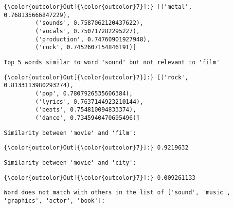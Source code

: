 \documentclass[11pt]{article}
\begin{document}
\begin{Verbatim}[commandchars=\\\{\}]
{\color{outcolor}Out[{\color{outcolor}7}]:} [('metal', 0.768135666847229),
         ('sounds', 0.7587062120437622),
         ('vocals', 0.750717282295227),
         ('production', 0.74760901927948),
         ('rock', 0.7452607154846191)]
\end{Verbatim}
            
    \begin{Verbatim}[commandchars=\\\{\}]
Top 5 words similar to word 'sound' but not relevant to 'film'

    \end{Verbatim}

\begin{Verbatim}[commandchars=\\\{\}]
{\color{outcolor}Out[{\color{outcolor}7}]:} [('rock', 0.8133113980293274),
         ('pop', 0.7807926535606384),
         ('lyrics', 0.7637144923210144),
         ('beats', 0.754810094833374),
         ('dance', 0.7345940470695496)]
\end{Verbatim}
            
    \begin{Verbatim}[commandchars=\\\{\}]
Similarity between 'movie' and 'film':

    \end{Verbatim}

\begin{Verbatim}[commandchars=\\\{\}]
{\color{outcolor}Out[{\color{outcolor}7}]:} 0.9219632
\end{Verbatim}
            
    \begin{Verbatim}[commandchars=\\\{\}]
Similarity between 'movie' and 'city':

    \end{Verbatim}

\begin{Verbatim}[commandchars=\\\{\}]
{\color{outcolor}Out[{\color{outcolor}7}]:} 0.009261133
\end{Verbatim}
            
    \begin{Verbatim}[commandchars=\\\{\}]
Word does not match with others in the list of ['sound', 'music', 'graphics', 'actor', 'book']:

    \end{Verbatim}
\end{document}

